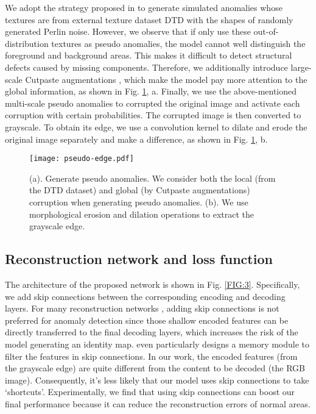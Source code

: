 \documentclass[5p, twocolumn]{elsarticle}[draft]
\begin{document}
We adopt the strategy proposed in \cite{zavrtanik2021draem} to generate simulated anomalies whose textures are from external texture dataset DTD \cite{cimpoi2014describing} with the shapes of randomly generated Perlin noise. However, we observe that if only use these out-of-distribution textures as pseudo anomalies, the model cannot well distinguish the foreground and background areas. This makes it difficult to detect structural defects caused by missing components. Therefore, we additionally introduce large-scale Cutpaste augmentations \cite{li2021cutpaste}, which make the model pay more attention to the global information, as shown in Fig. \ref{FIG:2}, a. Finally, we use the above-mentioned multi-scale pseudo anomalies to corrupted the original image and activate each corruption with certain probabilities. The corrupted image is then converted to grayscale. To obtain its edge, we use a  convolution kernel to dilate and erode the original image separately and make a difference, as shown in Fig. \ref{FIG:2}, b.  
\begin{figure}
    \centering
		\texttt{[image: pseudo-edge.pdf]}
	\caption{(a). Generate pseudo anomalies. We consider both the local (from the DTD dataset) and global (by Cutpaste augmentations) corruption when generating pseudo anomalies. (b). We use morphological erosion and dilation operations to extract the grayscale edge.}
	\label{FIG:2}
\end{figure}

\subsection{Reconstruction network and loss function}
\label{3.2}
The architecture of the proposed network is shown in Fig. \ref{FIG:3}. Specifically, we add skip connections between the corresponding encoding and decoding layers. For many reconstruction networks \cite{zavrtanik2021draem,zavrtanik2021reconstruction}, adding skip connections is not preferred for anomaly detection since those shallow encoded features can be directly transferred to the final decoding layers, which increases the risk of the model generating an identity map. \cite{hou2021divide} even particularly designs a memory module to filter the features in skip connections. In our work, the encoded features (from the grayscale edge) are quite different from the content to be decoded (the RGB image). Consequently, it's less likely that our model uses skip connections to take `shortcuts'. Experimentally, we find that using skip connections can boost our final performance because it can reduce the reconstruction errors of normal areas.
\end{document}
